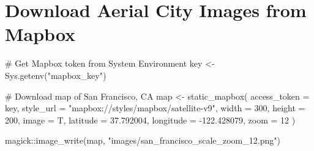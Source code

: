 \documentclass[
  letterpaper,
  DIV=11,
  numbers=noendperiod]{scrreprt}
\newenvironment{Shaded}{\begin{snugshade}}{\end{snugshade}}
\newcommand{\AttributeTok}[1]{\textcolor[rgb]{0.40,0.45,0.13}{#1}}
\newcommand{\CommentTok}[1]{\textcolor[rgb]{0.37,0.37,0.37}{#1}}
\newcommand{\DecValTok}[1]{\textcolor[rgb]{0.68,0.00,0.00}{#1}}
\newcommand{\FloatTok}[1]{\textcolor[rgb]{0.68,0.00,0.00}{#1}}
\newcommand{\FunctionTok}[1]{\textcolor[rgb]{0.28,0.35,0.67}{#1}}
\newcommand{\NormalTok}[1]{\textcolor[rgb]{0.00,0.23,0.31}{#1}}
\newcommand{\OtherTok}[1]{\textcolor[rgb]{0.00,0.23,0.31}{#1}}
\newcommand{\SpecialCharTok}[1]{\textcolor[rgb]{0.37,0.37,0.37}{#1}}
\newcommand{\StringTok}[1]{\textcolor[rgb]{0.13,0.47,0.30}{#1}}
\begin{document}
\section{Download Aerial City Images from
Mapbox}\label{download-aerial-city-images-from-mapbox}

\begin{Shaded}
\begin{Highlighting}[]
\CommentTok{\# Get Mapbox token from System Environment }
\NormalTok{key }\OtherTok{\textless{}{-}} \FunctionTok{Sys.getenv}\NormalTok{(}\StringTok{"mapbox\_key"}\NormalTok{) }
\end{Highlighting}
\end{Shaded}

\begin{Shaded}
\begin{Highlighting}[]
\CommentTok{\# Download map of San Francisco, CA}
\NormalTok{map }\OtherTok{\textless{}{-}} \FunctionTok{static\_mapbox}\NormalTok{(}
  \AttributeTok{access\_token =}\NormalTok{ key,}
  \AttributeTok{style\_url =} \StringTok{"mapbox://styles/mapbox/satellite{-}v9"}\NormalTok{,}
  \AttributeTok{width =} \DecValTok{300}\NormalTok{,}
  \AttributeTok{height =} \DecValTok{200}\NormalTok{, }
  \AttributeTok{image =}\NormalTok{ T, }\AttributeTok{latitude =} \FloatTok{37.792004}\NormalTok{, }\AttributeTok{longitude =} \SpecialCharTok{{-}}\FloatTok{122.428079}\NormalTok{, }\AttributeTok{zoom =} \DecValTok{12}
\NormalTok{)}

\NormalTok{magick}\SpecialCharTok{::}\FunctionTok{image\_write}\NormalTok{(map, }\StringTok{"images/san\_francisco\_scale\_zoom\_12.png"}\NormalTok{)}
\end{Highlighting}
\end{Shaded}
\end{document}

